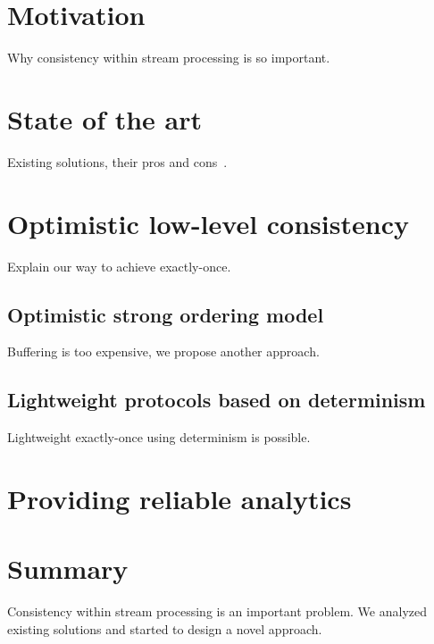 \documentclass{llncs}
\begin{document}
\section {Motivation}
Why consistency within stream processing is so important.

\section {State of the art}
Existing solutions, their pros and cons~\cite{Carbone:2017:SMA:3137765.3137777, Zaharia:2012:DSE:2342763.2342773}. 

\section {Optimistic low-level consistency}
Explain our way to achieve exactly-once.

\subsection{Optimistic strong ordering model}
Buffering is too expensive, we propose another approach.

\subsection{Lightweight protocols based on determinism}
Lightweight exactly-once using determinism is possible. 

\section{Providing reliable analytics}

\section {Summary}
Consistency within stream processing is an important problem. We analyzed existing solutions and started to design a novel approach.



\end{document}
